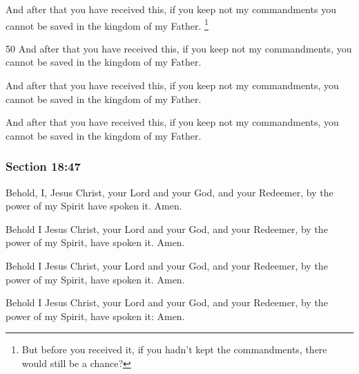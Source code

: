 		And after that you have received this, if you keep not my commandments you cannot be saved in the kingdom of my Father.%
			\footnote{%
				But before you received it, if you hadn't kept the commandments, there would still be a chance?
				}

		\begin{framed}
		\scriptsize
			\begin{compactdesc}
				\item[JSP] 50 And after that you have received this, if you keep not my commandments, you cannot be saved in the kingdom of my Father. 
				\item[DC 1835] And after that you have received this, if you keep not my commandments, you cannot be saved in the kingdom of my Father. 
				\item[DC 1844] And after that you have received this, if you keep not my commandments, you cannot be saved in the kingdom of my Father. 
			\end{compactdesc}
		\end{framed}

	\subsubsection{Section 18:47} %
		\label{DC18-47}

		Behold, I, Jesus Christ, your Lord and your God, and your Redeemer, by the power of my Spirit have spoken it.  Amen.

		\begin{framed}
		\scriptsize
			\begin{compactdesc}
				\item[JSP] Behold I Jesus Christ, your Lord and your God, and your Redeemer, by the power of my Spirit, have spoken it. Amen.
				\item[DC 1835] Behold I Jesus Christ, your Lord and your God, and your Redeemer, by the power of my Spirit, have spoken it. Amen.
				\item[DC 1844] Behold I Jesus Christ, your Lord and your God, and your Redeemer, by the power of my Spirit, have spoken it: Amen.
			\end{compactdesc}
		\end{framed}